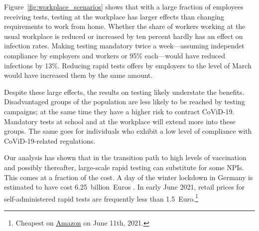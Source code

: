 Figure~\ref{fig:workplace_scenarios} shows that with a large fraction of employees receiving tests, testing at the workplace has larger effects than changing requirements to work from home. Whether the share of workers working at the usual workplace is reduced or increased by ten percent hardly has an effect on infection rates. Making testing mandatory twice a week---assuming independet compliance by employers and workers or 95\% each---would have reduced infections by 13\%. Reducing rapid tests offers by employers to the level of March would have increased them by the same amount. 

Despite these large effects, the results on testing likely understate the benefits.
Disadvantaged groups of the population are less likely to be reached by testing
campaigns; at the same time they have a higher risk to contract
CoViD-19.\citet{KochInstitut2021a} Mandatory tests at school and at the workplace will
extend more into these groups. The same goes for individuals who exhibit a low level of
compliance with CoViD-19-related regulations.

Our analysis has shown that in the transition path to high levels of vaccination and
possibly thereafter, large-scale rapid testing can substitute for some NPIs. This comes
at a fraction of the cost. A day of the winter lockdown in Germany is estimated to have
cost 6.25~billion~Euros \citep{Dorn2020b}. In early June 2021, retail prices for self-administered rapid tests
are frequently less than 1.5~Euro.\footnote{Cheapest on \href{https://amazon.de}{Amazon}
on June 11th, 2021.}
